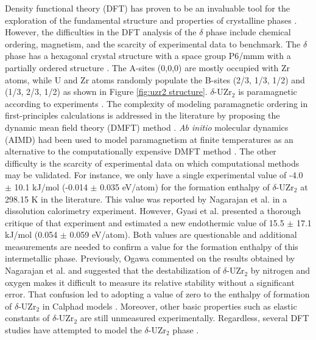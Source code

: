 \documentclass[preprint,12pt]{elsarticle}
\begin{document}
Density functional theory (DFT) has proven to be an invaluable tool for the exploration of the fundamental structure and properties of crystalline phases  \cite{cohen_challenges_2012, burke_perspective_2012}. However, the difficulties in the DFT analysis of the $\delta$ phase include chemical ordering, magnetism, and the scarcity of experimental data to benchmark. The $\delta$ phase has a hexagonal crystal structure with a space group P6/mmm with a partially ordered structure  \cite{akabori_stability_1992, akabori_lattice_1995}. The A-sites (0,0,0) are mostly occupied with Zr atoms, while U and Zr atoms randomly populate the B-sites (2/3, 1/3, 1/2) and (1/3, 2/3, 1/2) as shown in Figure \ref{fig:uzr2 structure}. $\delta$-UZr$_2$ is paramagnetic according to experiments  \cite{ding_magnetic_2021}. The complexity of modeling paramagnetic ordering in first-principles calculations is addressed in the literature by proposing the dynamic mean field theory (DMFT) method  \cite{anisimov_investigation_2014, abrikosov_recent_2016}. \textit{Ab initio} molecular dynamics (AIMD) had been used to model paramagnetism at finite temperatures as an alternative to the computationally expensive DMFT method  \cite{steneteg_equation_2012}. 
The other difficulty is the scarcity of experimental data on which computational methods may be validated. For instance, we only have a single experimental value of -4.0 $\pm$ 10.1 kJ/mol (-0.014 $\pm$ 0.035 eV/atom) for the formation enthalpy of $\delta$-UZr$_2$ at 298.15 K in the literature. This value was reported by Nagarajan et al. \cite{nagarajan_enthalpy_1993} in a dissolution calorimetry experiment. However, Gyasi et al. \cite{gyasi_about_2022} presented a thorough critique of that experiment and estimated a new endothermic value of 15.5 $\pm$ 17.1 kJ/mol (0.054 $\pm$ 0.059 eV/atom). Both values are questionable and additional measurements are needed to confirm a value for the formation enthalpy of this intermetallic phase. Previously, Ogawa \cite{ogawa_free_1994} commented on the results obtained by Nagarajan et al. \cite{nagarajan_enthalpy_1993} and suggested that the destabilization of $\delta$-UZr$_2$ by nitrogen and oxygen makes it difficult to measure its relative stability without a significant error. That confusion led to adopting a value of zero to the enthalpy of formation of $\delta$-UZr$_2$ in Calphad models \cite{chevalier_progress_2004}. Moreover, other basic properties such as elastic constants of $\delta$-UZr$_2$ are still unmeasured experimentally. Regardless, several DFT studies have attempted to model the $\delta$-UZr$_{2}$ phase \cite{landa_density-functional_2009, xie_correlation_2013, matar_first_2017, ghosh_chemical_2021}. 
\end{document}
